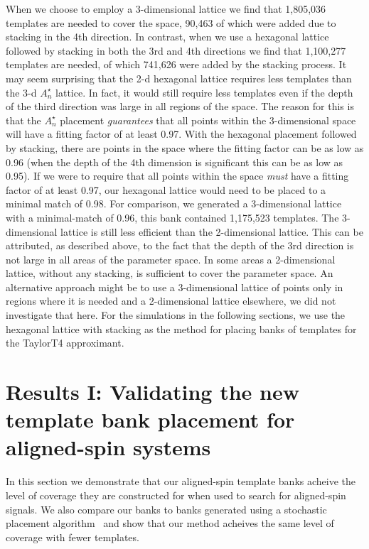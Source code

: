 When we choose to employ a 3-dimensional lattice we find that 1,805,036
templates are needed to cover the space, 90,463 of which were added due to
stacking in the 4th direction. In contrast, when we use a hexagonal lattice
followed by stacking in both the 3rd and 4th directions we find that 1,100,277
templates are needed, of which 741,626
were added by the stacking process. It may seem surprising that the 2-d
hexagonal lattice requires less templates
than the 3-d $A_n^{\star}$ lattice. In fact, it would still require less
templates even if the depth of the third
direction was large in all regions of the space. The reason for this is that the
$A_n^{\star}$ placement \emph{guarantees}
that all points within the 3-dimensional space will have a fitting factor of at
least 0.97. With the
hexagonal placement followed by stacking, there are points in the space where
the fitting factor can be as low as 0.96
(when the depth of the 4th dimension is significant this can be as low as 0.95).
If we were to require that all points
within the space \emph{must} have a fitting factor of at least 0.97, our
hexagonal lattice would need to be placed
to a minimal match of 0.98.
For comparison, we generated a 3-dimensional lattice with a minimal-match of 
0.96, this bank contained 1,175,523 templates. The 3-dimensional lattice is 
still less efficient than the 2-dimensional lattice. This can be attributed, as 
described above, to the fact that the depth of the 3rd direction is not large 
in all areas of the parameter space. In some areas a 2-dimensional lattice, 
without any stacking, is
sufficient to cover the parameter space. An alternative approach might be to use 
a 3-dimensional lattice of points only in regions where it is needed and a 
2-dimensional lattice elsewhere, we did not investigate that here. For the 
simulations in the following sections, we use the hexagonal lattice with
stacking as the method for placing banks of templates for the TaylorT4
approximant.

\section{Results I: Validating the new template bank placement for 
aligned-spin systems}
\label{sec:bank_validation}

In this section we demonstrate that our aligned-spin template banks acheive the
level of coverage they are constructed for when used to search for aligned-spin
signals. We also compare our banks to banks generated using a stochastic
placement algorithm~\cite{Harry:2009ea,Babak:2008rb,Manca:2009xw,Ajith:2012mn}
and show that our method acheives the same level of coverage with fewer
templates. 

